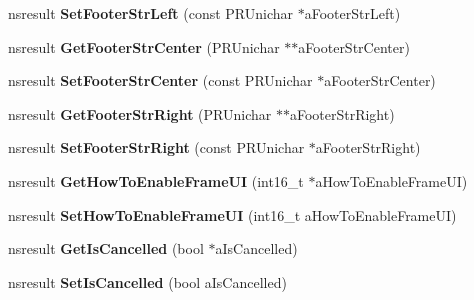\begin{DoxyCompactItemize}
nsresult {\bfseries Set\+Footer\+Str\+Left} (const P\+R\+Unichar $\ast$a\+Footer\+Str\+Left)
\item 
\mbox{\label{interfacens_i_print_settings_a85b8947863fff69acd305de517e7483f}} 
nsresult {\bfseries Get\+Footer\+Str\+Center} (P\+R\+Unichar $\ast$$\ast$a\+Footer\+Str\+Center)
\item 
\mbox{\label{interfacens_i_print_settings_af1d0d8a0e6bb26ea7a48ed0731a090b1}} 
nsresult {\bfseries Set\+Footer\+Str\+Center} (const P\+R\+Unichar $\ast$a\+Footer\+Str\+Center)
\item 
\mbox{\label{interfacens_i_print_settings_ad862a63d9b64ca7e7094e2d3dd6f0713}} 
nsresult {\bfseries Get\+Footer\+Str\+Right} (P\+R\+Unichar $\ast$$\ast$a\+Footer\+Str\+Right)
\item 
\mbox{\label{interfacens_i_print_settings_a76419cfa35cbd16f4cc5ad6886abd1f1}} 
nsresult {\bfseries Set\+Footer\+Str\+Right} (const P\+R\+Unichar $\ast$a\+Footer\+Str\+Right)
\item 
\mbox{\label{interfacens_i_print_settings_a19631babd006d8e6082752c171028f60}} 
nsresult {\bfseries Get\+How\+To\+Enable\+Frame\+UI} (int16\+\_\+t $\ast$a\+How\+To\+Enable\+Frame\+UI)
\item 
\mbox{\label{interfacens_i_print_settings_a0d81945918e63a35042928fd2709d39f}} 
nsresult {\bfseries Set\+How\+To\+Enable\+Frame\+UI} (int16\+\_\+t a\+How\+To\+Enable\+Frame\+UI)
\item 
\mbox{\label{interfacens_i_print_settings_a47fa994f563e42c7412d8c57c09ee073}} 
nsresult {\bfseries Get\+Is\+Cancelled} (bool $\ast$a\+Is\+Cancelled)
\item 
\mbox{\label{interfacens_i_print_settings_a29761a42e92375521cccc31675a52e49}} 
nsresult {\bfseries Set\+Is\+Cancelled} (bool a\+Is\+Cancelled)
\item 
\mbox{\label{interfacens_i_print_settings_ac2a126cd4010006140e402e424ef94a5}} 

\end{DoxyCompactItemize}
